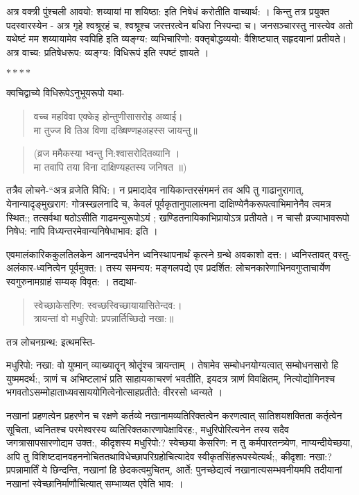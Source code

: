 {अत्र वक्त्री पुंश्चली आवयो: शय्यायां मा शयिष्ठा: इति निषेधं करोतीति वाच्यार्थ: । किन्तु तत्र प्रयुक्त पदस्वारस्येन - अत्र गृहे श्वश्रूरहं च, श्वश्रूश्च जरत्तरत्वेन बधिरा निस्पन्दा च। जनसञ्चारस्तु नास्त्येव अतो यथेष्टं मम शय्यायामेव स्वपिहि इति व्यङ्ग्य: व्यभिचारिणो: वक्तृबोद्धव्ययो: वैशिष्ट्यात् सहृदयानां प्रतीयते। अत्र वाच्य: प्रतिषेधरूप: व्यङ्ग्य: विधिरूपं इति स्पष्टं ज्ञायते ।

$****$

क्वचिद्वाच्ये विधिरूपेऽनुभूयरूपो यथा-
\begin{verse}
वच्च महविवा एक्केइ होन्तुणीसासरोइ अव्वाई।\\
मा तुज्ज वि तिअ विणा दख्षिण्णहअहस्स जायन्तु॥
\end{verse}
\begin{verse}
(व्रज ममैकस्या भ्वन्तु नि:श्वासरोदितव्यानि ।\\
मा तवापि तया विना दाक्षिण्यहतस्य जनिषत ॥)
\end{verse}
तत्रैव लोचने-“अत्र व्रजेति विधि:। न प्रमादादेव नायिकान्तरसंगमनं तव अपि तु गाढानुरागात्, येनान्यादृङ्मुखराग: गोत्रस्खलनादि च, केवलं पूर्वकृतानुपालात्मना दाक्षिण्येनैकरूपत्वाभिमानेनैव त्वमत्र स्थित:; तत्सर्वथा षठोऽसीति गाढमन्युरूपोऽयं ; खण्डितनायिकाभिप्रायोऽत्र प्रतीयते। न चासौ व्रज्याभावरूपो निषेध: नापि विध्यन्तरमेवान्यनिषेधाभाव: इति ।

एवमालंकारिककुलतिलकेन आनन्दवर्धनेन ध्वनिस्थापनार्थं कृत्स्ने ग्रन्थे अवकाशो दत्त:। ध्वनिस्तावत् वस्तु-अलंकार-ध्वनित्वेन पूर्वमुक्त:। तस्य समन्वय: मङ्गलपद्ये एव प्रदर्शित: लोचनकारेणाभिनवगुप्ताचार्येण स्वगुरुनामग्राहं सम्यक् विवृत: । तद्यथा-
\begin{verse}
स्वेच्छाकेसरिण: स्वच्छस्विच्छायायासितेन्दव:।\\
त्रायन्तां वो मधुरिपो: प्रपन्नार्तिच्छिदो नखा:॥
\end{verse}
तत्र लोचनग्रन्थ: इत्थमस्ति-

मधुरिपो: नखा: वो युष्मान् व्याख्यातॄन् श्रोतॄंश्च त्रायन्ताम् । तेषामेव सम्बोधनयोग्यत्वात् सम्बोधनसारो हि युष्ममदर्थ:, त्राणं च अभिष्टलाभं प्रति साहायकाचरणं भवतीति, इयदत्र त्राणं विवक्षितम्, नित्योद्योगिनश्च भगवतोऽसम्मोहाताध्यवसाययोगित्वेनोत्साहप्रतीते: वीररसो ध्वन्यते ।

नखानां प्रहणत्वेन प्रहरणेन च रक्षणे कर्तव्ये नखानामव्यतिरिक्तत्वेन करणत्वात् सातिशयशक्तिता कर्तृत्वेन सूचिता, ध्वनितश्च परमेश्वरस्य व्यतिरिक्तकारणापेक्षाविरह:, मधुरिपोरित्यनेन तस्य सदैव जगत्रासापसारणोद्यम उक्त:, कीदृशस्य मधुरिपो:? स्वेच्छया केसरिण: न तु कर्मपारतन्त्र्येण, नाप्यन्दीयेच्छया, अपि तु विशिष्टदानवहननोचिततथाविधेच्छापरिग्रहोचित्यादेव स्वीकृतसिंहरूपस्येत्यर्थ;, कीदृशा: नखा:? प्रपन्नामार्तिं ये छिन्दन्ति, नखानां हि छेदकत्वमुचितम्, आर्ते: पुनच्छेद्यत्वं नखानात्यसम्भवनीयमपि तदीयानां नखानां स्वेच्छानिर्माणौचित्यात् सम्भाव्यत एवेति भाव: ।

}
